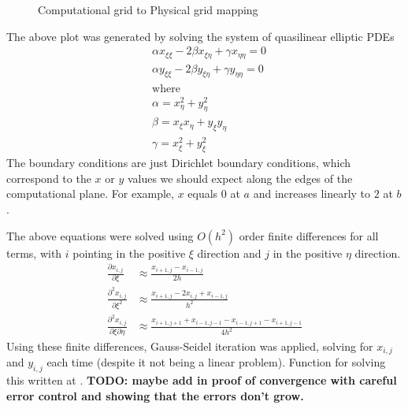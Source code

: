 \documentclass{article}
\numberwithin{equation}{section}
\theoremstyle{definition}
\newcommand{\pp}[2]{\frac{\partial #1}{\partial #2}}
\newcommand{\ppn}[3]{\frac{\partial^{#1} #2}{\partial #3^{#1}}}
\begin{document}
\begin{figure}[H]
    \centering
    \hfill
    \caption{Computational grid to Physical grid mapping}
    \label{fig:fig10}
\end{figure}
The above plot was generated by solving the system of quasilinear elliptic PDEs
\begin{align}
    &\alpha x_{\xi\xi} - 2\beta x_{\xi\eta} + \gamma x_{\eta\eta} = 0 \\
    &\alpha y_{\xi\xi} - 2\beta y_{\xi\eta} + \gamma y_{\eta\eta} = 0 \\
    &\text{where} \\
    &\alpha = x_{\eta}^2 + y_{\eta}^2 \\
    &\beta = x_{\xi} x_{\eta} + y_{\xi} y_{\eta} \\
    &\gamma = x_{\xi}^2 + y_{\xi}^2
\end{align}
The boundary conditions are just Dirichlet boundary conditions, which correspond to the $x$ or $y$ values we should expect along the edges of the computational plane. For example, $x$ equals $0$ at $a$ and increases linearly to $2$ at $b$.

The above equations were solved using $O(h^2)$ order finite differences for all terms, with $i$ pointing in the positive $\xi$ direction and $j$ in the positive $\eta$ direction.
\begin{align}
    \pp{x_{i,j}}{\xi} &\approx \frac{x_{i+1,j} - x_{i-1,j}}{2h} \\
    \ppn{2}{x_{i,j}}{\xi} &\approx \frac{x_{i+1,j} - 2x_{i,j} + x_{i-1,j}}{h^2} \\
    \frac{\partial^2 x_{i,j}}{\partial \xi \partial \eta} &\approx \frac{x_{i+1,j+1} + x_{i-1,j-1} - x_{i-1,j+1} - x_{i+1,j-1}}{4h^2}
\end{align}
Using these finite differences, Gauss-Seidel iteration was applied, solving for $x_{i,j}$ and $y_{i,j}$ each time (despite it not being a linear problem). Function for solving this written at . \textbf{TODO: maybe add in proof of convergence with careful error control and showing that the errors don't grow.}
\end{document}
